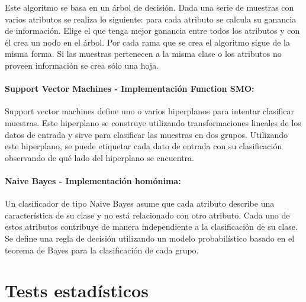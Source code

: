 
Este algoritmo se basa en un árbol de decisión. Dada una serie de muestras con varios atributos se realiza lo siguiente: para cada atributo se calcula su ganancia de información. Elige el que tenga mejor ganancia entre todos los atributos y con él crea un nodo en el árbol. Por cada rama que se crea el algoritmo sigue de la misma forma. Si las muestras pertenecen a la misma clase o los atributos no proveen información se crea sólo una hoja.

\paragraph{Support Vector Machines \cite{Platt98sequentialminimal} - Implementación Function SMO:}


Support vector machines define uno o varios hiperplanos para intentar clasificar muestras. Este hiperplano se construye utilizando transformaciones lineales de los datos de entrada y sirve para clasificar las muestras en dos grupos. Utilizando este hiperplano, se puede etiquetar cada dato de entrada con su clasificación observando de qué lado del hiperplano se encuentra.

\paragraph{Naive Bayes \cite{DBLP:conf/flairs/Zhang04} - Implementación homónima:}


Un clasificador de tipo Naive Bayes asume que cada atributo describe una característica de su clase y no está relacionado con otro atributo. Cada uno de estos atributos contribuye de manera independiente a la clasificación de su clase. Se define una regla de decisión utilizando un modelo probabilístico basado en el teorema de Bayes para la clasificación de cada grupo.

\section{Tests estadísticos}

